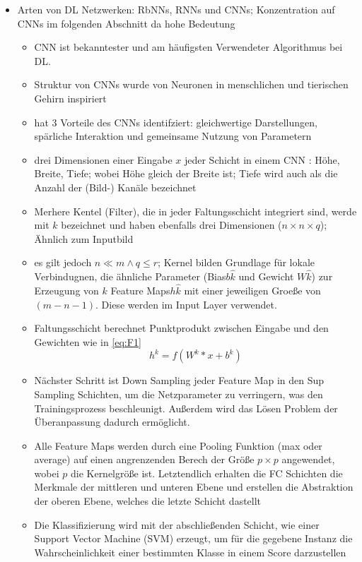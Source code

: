 \begin{itemize}
    \item Arten von DL Netzwerken: RbNNs, RNNs und CNNs; Konzentration auf CNNs im folgenden Abschnitt da hohe Bedeutung
    \begin{itemize}
        \item CNN ist bekanntester und am häufigsten Verwendeter Algorithmus bei DL.
        \item Struktur von CNNs wurde von Neuronen in menschlichen und tierischen Gehirn inspiriert
        \item \cite{Goodfellow-et-al-2016} hat 3 Vorteile des CNNs identifziert: gleichwertige Darstellungen, spärliche Interaktion und gemeinsame Nutzung von Parametern
        \item drei Dimensionen einer Eingabe $x$ jeder Schicht in einem CNN : Höhe, Breite, Tiefe; wobei Höhe gleich der Breite ist; Tiefe wird auch als die Anzahl der (Bild-) Kanäle bezeichnet
        \item Merhere Kentel (Filter), die in jeder Faltungsschicht integriert sind, werde mit $k$ bezeichnet und haben ebenfalls drei Dimensionen ($n\times n  \times q$); Ähnlich zum Inputbild
        \item es gilt jedoch $n \ll m \land q \le r$; Kernel bilden Grundlage für lokale Verbindugnen, die ähnliche Parameter (Bias$b\hat{k}$ und Gewicht $W\hat{k}$) zur Erzeugung von $k$ Feature Maps$h\hat{k}$ mit einer jeweiligen Groeße von $(m-n-1)$. Diese werden im Input Layer verwendet. 
        \item Faltungsschicht berechnet Punktprodukt zwischen Eingabe und den Gewichten wie in \ref{eq:F1}
        \begin{equation}
        \label{eq:F1}
        h^k = f(W^k \ast x + b^k)
        \end{equation}
        \item Nächster Schritt ist Down Sampling jeder Feature Map in den Sup Sampling Schichten, um die Netzparameter zu verringern, was den Trainingsprozess beschleunigt. Außerdem wird das Lösen Problem der Überanpassung dadurch ermöglicht.
        \item Alle Feature Maps werden durch eine Pooling Funktion (max oder average) auf einen angrenzenden Berech der Größe $p \times p $ angewendet, wobei $p$ die Kernelgröße ist. Letztendlich erhalten die FC Schichten die Merkmale der mittleren und unteren Ebene und erstellen die Abstraktion der oberen Ebene, welches die letzte Schicht dastellt
        \item  Die Klassifizierung wird mit der abschließenden Schicht, wie einer Support Vector Machine (SVM) erzeugt, um für die gegebene Instanz die Wahrscheinlichkeit einer bestimmten Klasse in einem Score darzustellen

\end{itemize}
\end{itemize}
